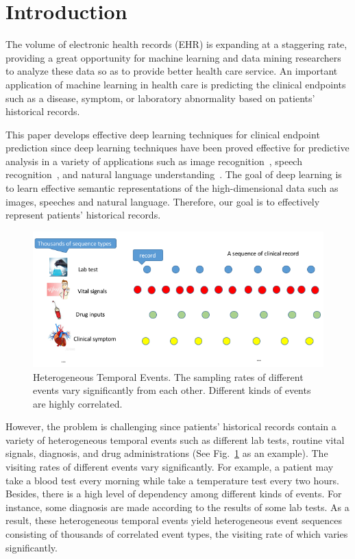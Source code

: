 \documentclass[letterpaper]{article} %
\begin{document}
\section{Introduction}

The volume of electronic health records (EHR) is expanding at a staggering rate, providing a great opportunity for machine learning and data mining researchers to analyze these data so as to provide better health care service. An important application of machine learning in health care is predicting the clinical endpoints such as a disease, symptom, or laboratory abnormality based on patients' historical records.

This paper develops effective deep learning techniques for clinical endpoint prediction since deep learning techniques have been proved effective for predictive analysis in a variety of applications such as image recognition~\cite{he2016deep}, speech recognition~\cite{hinton2012deep}, and natural language understanding~\cite{blunsom2017characters}. The goal of deep learning is to learn effective semantic representations of the high-dimensional data such as images, speeches and natural language. Therefore, our goal is to effectively represent patients' historical records.

\begin{figure}[!t]
\centering
\includegraphics[width=.8\linewidth]{data1.png}

\caption{Heterogeneous Temporal Events. The sampling rates of different events vary significantly from each other. Different kinds of events are highly correlated.}

\label{fig:distr time interval}
\end{figure}

However, the problem is challenging since patients' historical records contain a variety of heterogeneous temporal events such as different lab tests, routine vital signals, diagnosis, and drug administrations (See Fig.~\ref{fig:distr time interval} as an example). The visiting rates of different events vary significantly. For example, a patient may take a blood test every morning while take a temperature test every two hours. Besides, there is a high level of dependency among different kinds of events. For instance, some diagnosis are made according to the results of some lab tests. As a result, these heterogeneous temporal events yield heterogeneous event sequences consisting of thousands of correlated event types, the visiting rate of which varies significantly.
\end{document}
